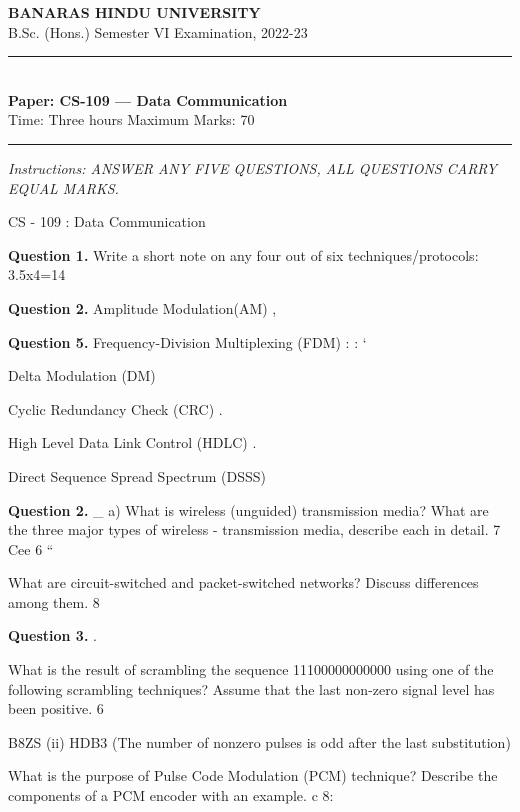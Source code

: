 \documentclass[11pt,a4paper]{article}
\begin{document}
\begin{center}
  {\large\bfseries BANARAS HINDU UNIVERSITY}\\[2pt]
  {\normalsize B.Sc. (Hons.) Semester VI Examination, 2022-23}\\[6pt]
  \rule{0.8\linewidth}{0.5pt}\\[6pt]
  {\large\bfseries Paper: CS-109 --- Data Communication}\\[4pt]
  {\normalsize Time: Three hours \hfill Maximum Marks: 70}
\end{center}

\rule{\linewidth}{0.4pt}

\smallskip
\noindent\textit{Instructions: ANSWER ANY FIVE QUESTIONS, ALL QUESTIONS CARRY EQUAL MARKS.}

\bigskip

CS - 109 : Data Communication

\medskip\noindent\textbf{Question 1.} Write a short note on any four out of six techniques/protocols: 3.5x4=14

\medskip\noindent\textbf{Question 2.} Amplitude Modulation(AM) ,

\medskip\noindent\textbf{Question 5.} Frequency-Division Multiplexing (FDM) : : ‘
\begin{parts}
  \item Delta Modulation (DM)
  \item Cyclic Redundancy Check (CRC) .
  \item High Level Data Link Control (HDLC) .
  \item Direct Sequence Spread Spectrum (DSSS)
\end{parts}

\medskip\noindent\textbf{Question 2.}
\_ a) What is wireless (unguided) transmission media? What are the three major types of wireless
- transmission media, describe each in detail. 7 Cee 6 “
\begin{parts}
  \item What are circuit-switched and packet-switched networks? Discuss differences among them. 8
\end{parts}

\medskip\noindent\textbf{Question 3.} .
\begin{parts}
  \item What is the result of scrambling the sequence 11100000000000 using one of the following
  scrambling techniques? Assume that the last non-zero signal level has been positive. 6
  \item B8ZS (ii) HDB3 (The number of nonzero pulses is odd after the last substitution)
  \item What is the purpose of Pulse Code Modulation (PCM) technique? Describe the components of a
  PCM encoder with an example. c 8:
\end{parts}
\end{document}
